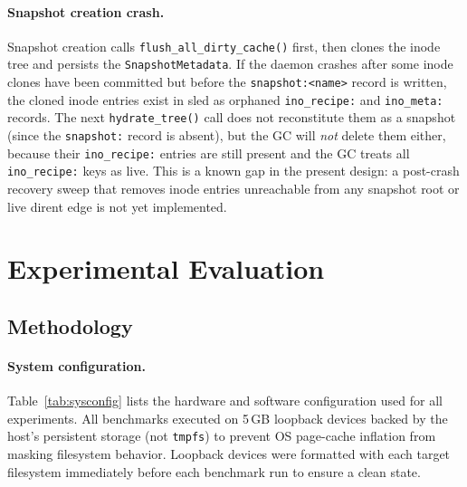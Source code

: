 \documentclass[5p,times]{elsarticle}
\begin{document}
\paragraph{Snapshot creation crash.}
Snapshot creation calls \texttt{flush\_all\_dirty\_cache()} first, then
clones the inode tree and persists the \texttt{SnapshotMetadata}.  If
the daemon crashes after some inode clones have been committed but
before the \texttt{snapshot:\textless{}name\textgreater{}} record is
written, the cloned inode entries exist in sled as orphaned
\texttt{ino\_recipe:} and \texttt{ino\_meta:} records.  The next
\texttt{hydrate\_tree()} call does not reconstitute them as a snapshot
(since the \texttt{snapshot:} record is absent), but the GC will
\emph{not} delete them either, because their \texttt{ino\_recipe:}
entries are still present and the GC treats all \texttt{ino\_recipe:}
keys as live.  This is a known gap in the present design: a post-crash recovery sweep
that removes inode entries unreachable from any snapshot root or live
dirent edge is not yet implemented.

\section{Experimental Evaluation}
\label{sec:eval}

\subsection{Methodology}

\paragraph{System configuration.}
Table~\ref{tab:sysconfig} lists the hardware and software configuration
used for all experiments.  All benchmarks executed on 5\,GB loopback
devices backed by the host's persistent storage (not \texttt{tmpfs}) to
prevent OS page-cache inflation from masking filesystem behavior.
Loopback devices were formatted with each target filesystem immediately
before each benchmark run to ensure a clean state.
\end{document}
